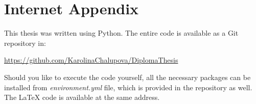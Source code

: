 \chapter{Internet Appendix}

This thesis was written using Python. The entire code is available as a Git repository in:   

\url{https://github.com/KarolinaChalupova/DiplomaThesis} 
 

Should you like to execute the code yourself, all the necessary packages can be installed from \textit{environment.yml} file, which is provided in the repository as well. The LaTeX code is available at the same address. 


